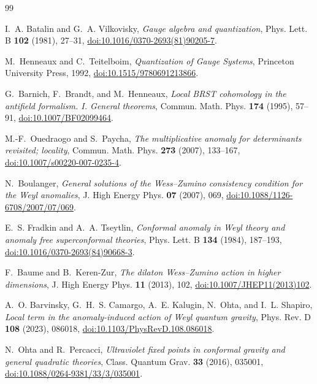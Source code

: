 \documentclass[11pt]{article}
\theoremstyle{definition}
\theoremstyle{remark}
\begin{document}
\begin{thebibliography}{99}
\raggedright

I.~A. Batalin and G.~A. Vilkovisky,
\emph{Gauge algebra and quantization},
Phys. Lett. B \textbf{102} (1981), 27--31,
\href{https://doi.org/10.1016/0370-2693(81)90205-7}{doi:10.1016/0370-2693(81)90205-7}.

M.~Henneaux and C.~Teitelboim,
\emph{Quantization of Gauge Systems},
Princeton University Press, 1992,
\href{https://doi.org/10.1515/9780691213866}{doi:10.1515/9780691213866}.

G.~Barnich, F.~Brandt, and M.~Henneaux,
\emph{Local BRST cohomology in the antifield formalism. I. General theorems},
Commun. Math. Phys. \textbf{174} (1995), 57--91,
\href{https://doi.org/10.1007/BF02099464}{doi:10.1007/BF02099464}.

M.-F.~Ouedraogo and S.~Paycha,
\emph{The multiplicative anomaly for determinants revisited; locality},
Commun. Math. Phys. \textbf{273} (2007), 133--167,
\href{https://doi.org/10.1007/s00220-007-0235-4}
{doi:10.1007/s00220-007-0235-4}.

N.~Boulanger,
\emph{General solutions of the Wess--Zumino consistency condition for the
Weyl anomalies},
J. High Energy Phys. \textbf{07} (2007), 069,
\href{https://doi.org/10.1088/1126-6708/2007/07/069}
{doi:10.1088/1126-6708/2007/07/069}.

E.~S. Fradkin and A.~A. Tseytlin,
\emph{Conformal anomaly in Weyl theory and anomaly free superconformal
theories},
Phys. Lett. B \textbf{134} (1984), 187--193,
\href{https://doi.org/10.1016/0370-2693(84)90668-3}
{doi:10.1016/0370-2693(84)90668-3}.

F.~Baume and B.~Keren-Zur,
\emph{The dilaton Wess--Zumino action in higher dimensions},
J. High Energy Phys. \textbf{11} (2013), 102,
\href{https://doi.org/10.1007/JHEP11(2013)102}
{doi:10.1007/JHEP11(2013)102}.

A.~O. Barvinsky, G.~H.~S. Camargo, A.~E. Kalugin, N.~Ohta, and I.~L. Shapiro,
\emph{Local term in the anomaly-induced action of Weyl quantum gravity},
Phys. Rev. D \textbf{108} (2023), 086018,
\href{https://doi.org/10.1103/PhysRevD.108.086018}
{doi:10.1103/PhysRevD.108.086018}.

N.~Ohta and R.~Percacci,
\emph{Ultraviolet fixed points in conformal gravity and general quadratic
theories},
Class. Quantum Grav. \textbf{33} (2016), 035001,
\href{https://doi.org/10.1088/0264-9381/33/3/035001}
{doi:10.1088/0264-9381/33/3/035001}.


\end{thebibliography}
\end{document}
